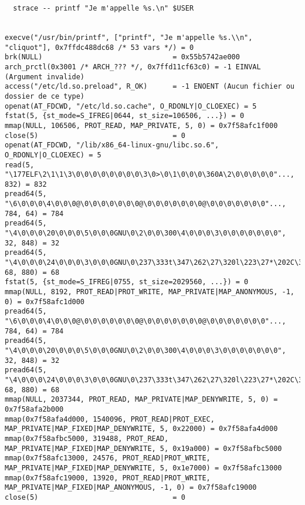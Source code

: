\documentclass[11pt]{article}
\begin{document}
\begin{lstlisting}
  strace -- printf "Je m'appelle %s.\n" $USER


execve("/usr/bin/printf", ["printf", "Je m'appelle %s.\\n", "cliquot"], 0x7ffdc488dc68 /* 53 vars */) = 0
brk(NULL)                               = 0x55b5742ae000
arch_prctl(0x3001 /* ARCH_??? */, 0x7ffd11cf63c0) = -1 EINVAL (Argument invalide)
access("/etc/ld.so.preload", R_OK)      = -1 ENOENT (Aucun fichier ou dossier de ce type)
openat(AT_FDCWD, "/etc/ld.so.cache", O_RDONLY|O_CLOEXEC) = 5
fstat(5, {st_mode=S_IFREG|0644, st_size=106506, ...}) = 0
mmap(NULL, 106506, PROT_READ, MAP_PRIVATE, 5, 0) = 0x7f58afc1f000
close(5)                                = 0
openat(AT_FDCWD, "/lib/x86_64-linux-gnu/libc.so.6", O_RDONLY|O_CLOEXEC) = 5
read(5, "\177ELF\2\1\1\3\0\0\0\0\0\0\0\0\3\0>\0\1\0\0\0\360A\2\0\0\0\0\0"..., 832) = 832
pread64(5, "\6\0\0\0\4\0\0\0@\0\0\0\0\0\0\0@\0\0\0\0\0\0\0@\0\0\0\0\0\0\0"..., 784, 64) = 784
pread64(5, "\4\0\0\0\20\0\0\0\5\0\0\0GNU\0\2\0\0\300\4\0\0\0\3\0\0\0\0\0\0\0", 32, 848) = 32
pread64(5, "\4\0\0\0\24\0\0\0\3\0\0\0GNU\0\237\333t\347\262\27\320l\223\27*\202C\370T\177"..., 68, 880) = 68
fstat(5, {st_mode=S_IFREG|0755, st_size=2029560, ...}) = 0
mmap(NULL, 8192, PROT_READ|PROT_WRITE, MAP_PRIVATE|MAP_ANONYMOUS, -1, 0) = 0x7f58afc1d000
pread64(5, "\6\0\0\0\4\0\0\0@\0\0\0\0\0\0\0@\0\0\0\0\0\0\0@\0\0\0\0\0\0\0"..., 784, 64) = 784
pread64(5, "\4\0\0\0\20\0\0\0\5\0\0\0GNU\0\2\0\0\300\4\0\0\0\3\0\0\0\0\0\0\0", 32, 848) = 32
pread64(5, "\4\0\0\0\24\0\0\0\3\0\0\0GNU\0\237\333t\347\262\27\320l\223\27*\202C\370T\177"..., 68, 880) = 68
mmap(NULL, 2037344, PROT_READ, MAP_PRIVATE|MAP_DENYWRITE, 5, 0) = 0x7f58afa2b000
mmap(0x7f58afa4d000, 1540096, PROT_READ|PROT_EXEC, MAP_PRIVATE|MAP_FIXED|MAP_DENYWRITE, 5, 0x22000) = 0x7f58afa4d000
mmap(0x7f58afbc5000, 319488, PROT_READ, MAP_PRIVATE|MAP_FIXED|MAP_DENYWRITE, 5, 0x19a000) = 0x7f58afbc5000
mmap(0x7f58afc13000, 24576, PROT_READ|PROT_WRITE, MAP_PRIVATE|MAP_FIXED|MAP_DENYWRITE, 5, 0x1e7000) = 0x7f58afc13000
mmap(0x7f58afc19000, 13920, PROT_READ|PROT_WRITE, MAP_PRIVATE|MAP_FIXED|MAP_ANONYMOUS, -1, 0) = 0x7f58afc19000
close(5)                                = 0

\end{lstlisting}
\end{document}
